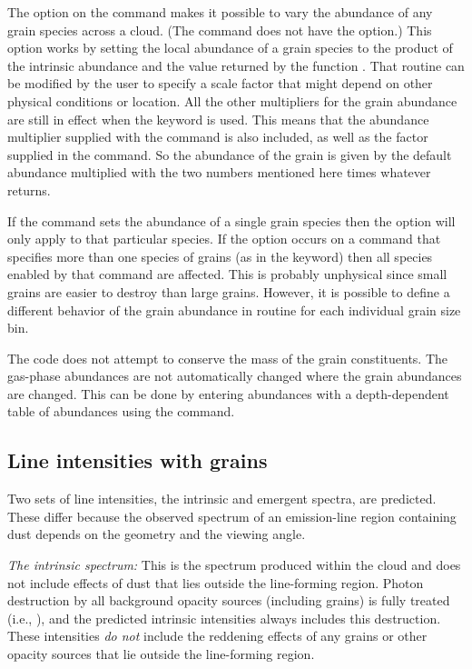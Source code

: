 The  option on the  command
makes it possible to vary the
abundance of any grain species across a cloud.
(The  command
does not have the  option.)
This option works by setting the local
abundance of a grain species to the product of the intrinsic abundance and
the value returned by the function .
That routine can be modified
by the user to specify a scale factor that might depend on other
physical conditions or location.
All the other multipliers for the grain abundance
are still in effect when the keyword  is used.
This means that
the abundance multiplier supplied with the  command
is also included,
as well as the factor supplied in the  command.
So the abundance of the grain is given by the default abundance
multiplied with the two numbers mentioned here times whatever
 returns.

If the  command sets the abundance of
a single grain species then
the  option will only apply to
that particular species.
If the option occurs on a  command
that specifies more than one species of grains (as in the
 keyword) then all species enabled by that command
are affected.
This is probably unphysical since small grains are easier
to destroy than large grains.
However, it is possible to define a different
behavior of the grain abundance in routine 
for each individual grain size bin.

The code does not attempt to conserve the mass of
the grain constituents.
The gas-phase abundances are not automatically changed
where the grain abundances are changed.
This can be done by entering abundances with a depth-dependent
table of abundances using the  command.

\subsection{Line intensities with grains}

Two sets of line intensities, the intrinsic and emergent spectra, are
predicted.
These differ because the observed spectrum of an emission-line
region containing dust depends on the geometry and the viewing angle.

\emph{The intrinsic spectrum:}
This is the spectrum produced within the cloud
and does not include effects of dust that lies outside the line-forming
region.
Photon destruction by all background opacity sources (including
grains) is fully treated (i.e., \citealp{Hummer1968}),
and the predicted intrinsic
intensities always includes this destruction.
These intensities \emph{do not}
include the reddening effects of any grains or
other opacity sources that
lie outside the line-forming region.

